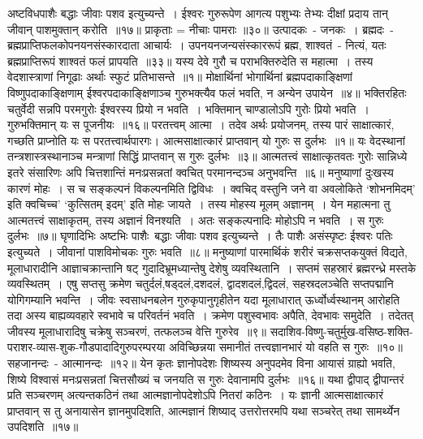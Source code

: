 \indent अष्टविधपाशैः बद्धाः जीवाः पशव इत्युच्यन्ते~। ईश्वरः गुरुरूपेण आगत्य पशुभ्यः तेभ्यः दीक्षां प्रदाय तान् जीवान्  पाशमुक्तान् करोति~॥१७॥
\indent प्राकृताः = नीचाः पामराः ॥३०॥
\indent  उत्पादकः~- जनकः~। ब्रह्मदः~- ब्रह्मप्राप्तिफलकोपनयनसंस्कारदाता  आचार्यः~। उपनयनजन्यसंस्काररूपं ब्रह्म, शाश्वतं~- नित्यं, यतः ब्रह्मप्राप्तिरूपं शाश्वतं फलं प्रापयति~॥३३॥
\indent  यस्य देवे गुरौ च पराभक्तिरुदेति स महात्मा~। तस्य वेदशास्त्राणां निगूढाः अर्थाः स्फुटं प्रतिभासन्ते~॥१॥
\indent  मोक्षार्थिनां भोगार्थिनां ब्रह्मपदाकाङ्क्षिणां विष्णुपदाकाङ्क्षिणाम् ईश्वरपदाकाङ्क्षिणाञ्च गुरुभक्त्यैव फलं भवति,  न अन्येन उपायेन~॥४॥
\indent  भक्तिरहितः चतुर्वेदी सन्नपि  परमगुरोः ईश्वरस्य प्रियो न भवति~। भक्तिमान् चाण्डालोऽपि गुरोः प्रियो भवति~। गुरुभक्तिमान् यः स पूजनीयः~॥१६॥  
\indent  परतत्त्वम् आत्मा~। तदेव अर्थः प्रयोजनम्, तस्य पारं साक्षात्कारं, गच्छति प्राप्नोति यः स परतत्त्वार्थपारगः। आत्मसाक्षात्कारं प्राप्तवान् यो गुरुः स दुर्लभः~॥१॥
\indent यः वेदस्थानां तन्त्रशास्त्रस्थानाञ्च मन्त्राणां सिद्धिं प्राप्तवान् स गुरुः दुर्लभः~॥३॥
\indent  आत्मतत्त्वं साक्षात्कृतवतः गुरोः सान्निध्ये इतरे संसारिणः अपि चित्तशान्तिं मनःप्रसन्नतां क्वचित् परमानन्दञ्च अनुभवन्ति~॥६॥
\indent  मनुष्याणां दुःखस्य कारणं मोहः~। स च सङ्कल्पनं विकल्पनमिति द्विविधः~। क्वचिद् वस्तुनि जने वा अवलोकिते  ‘शोभनमिदम्’ इति क्वचिच्च’ ‘कुत्सितम् इदम्’ इति मोहः जायते~। तस्य मोहस्य मूलम् अज्ञानम्~। येन महात्मना तु आत्मतत्त्वं साक्षाकृतम्, तस्य अज्ञानं विनश्यति~। अतः सङ्कल्पनादिः मोहोऽपि न भवति~। स गुरुः दुर्लभः~॥७॥
\indent घृणादिभिः अष्टभिः पाशैः\footB\ बद्धाः जीवाः पशव इत्युच्यन्ते~। तैः पाशैः असंस्पृष्टः ईश्वरः पतिः इत्युच्यते~। जीवानां पाशविमोचकः गुरुः भवति~॥८॥
\indent  मनुष्याणां पारमार्थिकं शरीरं चक्रसप्तकयुक्तं विद्यते, मूलाधारादीनि आज्ञाचक्रान्तानि षट् गुदादिभ्रूमध्यान्तेषु देशेषु व्यवस्थितानि~। सप्तमं  सहस्रारं ब्रह्मरन्ध्रे मस्तके व्यवस्थितम्~। एषु सप्तसु क्रमेण चतुर्दलं,षड्दलं,दशदलं, द्वादशदलं,द्विदलं, सहस्रदलञ्चेति सप्तपद्मानि योगिगम्यानि भवन्ति~। जीवः स्वसाधनबलेन गुरुकृपानुगृहीतेन यदा मूलाधारात् ऊर्ध्वोर्ध्वस्थानम् आरोहति तदा अस्य बाह्यव्यवहारे स्वभावे च परिवर्तनं भवति~। क्रमेण पशुस्वभावः अपैति, देवभावः समुदेति~। तदेतत् जीवस्य मूलाधारादिषु चक्रेषु सञ्चरणं, तत्फलञ्च वेत्ति गुरुरेव~॥९॥
\indent  सदाशिव-विष्णु-चतुर्मुख-वसिष्ठ-शक्ति-पराशर-व्यास-शुक-गौडपादादिगुरुपरम्परया अविच्छिन्नया समानीतं तत्त्वज्ञानभारं यो वहति स गुरुः~॥१०॥
\indent  सहजानन्दः~- आत्मानन्दः~॥१२॥
\indent  येन कृतः ज्ञानोपदेशः शिष्यस्य अनुपदमेव विना आयासं ग्राह्यो भवति, शिष्ये विश्वासं मनःप्रसन्नतां चित्तसौख्यं च जनयति स गुरुः देवानामपि दुर्लभः~॥१६॥
\indent यथा द्वीपाद् द्वीपान्तरं प्रति सञ्चरणम् अत्यन्तकठिनं तथा आत्मज्ञानोपदेशोऽपि नितरां कठिनः~। यः ज्ञानी आत्मसाक्षात्कारं प्राप्तवान् स तु अनायासेन ज्ञानमुपदिशति, आत्मज्ञानं शिष्याद् उत्तरोत्तरमपि यथा सञ्चरेत् तथा सामर्थ्येन उपदिशति~॥१७॥

